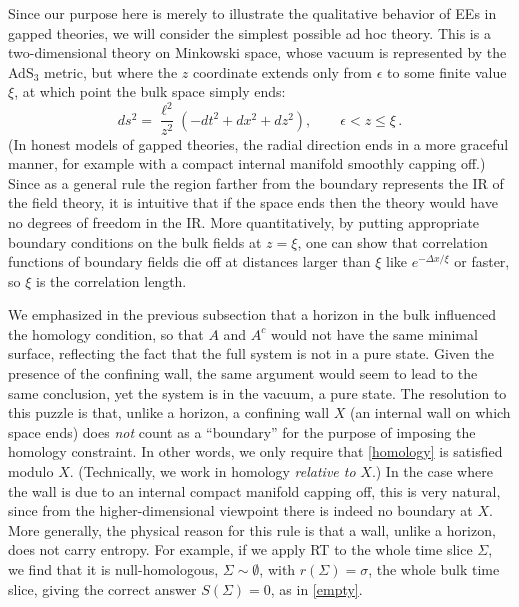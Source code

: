 \documentclass[11pt]{article}
\begin{document}
Since our purpose here is merely to illustrate the qualitative behavior of EEs in gapped theories, we will consider the simplest possible ad hoc theory. This is a two-dimensional theory on Minkowski space, whose vacuum is represented by the AdS$_3$ metric, but where the $z$ coordinate extends only from $\epsilon$ to some finite value $\xi$, at which point the bulk space simply ends:
\begin{equation}\label{confining}
ds^2 = \frac{\ell^2}{z^2}\left(-dt^2+dx^2+dz^2\right),
\qquad \epsilon<z\le\xi\,.
\end{equation}
(In honest models of gapped theories, the radial direction ends in a more graceful manner, for example with a compact internal manifold smoothly capping off.) Since as a general rule the region farther from the boundary represents the IR of the field theory, it is intuitive that if the space ends then the theory would have no degrees of freedom in the IR. More quantitatively, by putting appropriate boundary conditions on the bulk fields at $z=\xi$, one can show that correlation functions of boundary fields die off at distances larger than $\xi$ like $e^{-\Delta x/\xi}$ or faster, so $\xi$ is the correlation length.

We emphasized in the previous subsection that a horizon in the bulk influenced the homology condition, so that $A$ and $A^c$ would not have the same minimal surface, reflecting the fact that the full system is not in a pure state. Given the presence of the confining wall, the same argument would seem to lead to the same conclusion, yet the system is in the vacuum, a pure state. The resolution to this puzzle is that, unlike a horizon, a confining wall $X$ (an internal wall on which space ends) does \emph{not} count as a ``boundary'' for the purpose of imposing the homology constraint. In other words, we only require that \eqref{homology} is satisfied modulo $X$. (Technically, we work in homology \emph{relative to} $X$.) In the case where the wall is due to an internal compact manifold capping off, this is very natural, since from the higher-dimensional viewpoint there is indeed no boundary at $X$. More generally, the physical reason for this rule is that a wall, unlike a horizon, does not carry entropy. For example, if we apply RT to the whole time slice $\Sigma$, we find that it is null-homologous, $\Sigma\sim\emptyset$, with $r(\Sigma)=\sigma$, the whole bulk time slice, giving the correct answer $S(\Sigma)=0$, as in \eqref{empty}.
\end{document}
